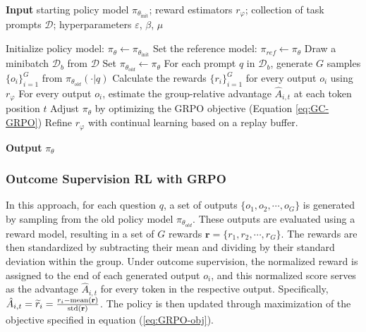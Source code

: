 \begin{itemize}[topsep=0pt]
\begin{algorithm}[t]
  \small
  \caption{Iterative Group Relative Policy Optimization}
  \textbf{Input} starting policy model $\pi_{\theta_{\text{init}}}$; reward estimators $r_\varphi$; collection of task prompts $\mathcal{D}$; 
  hyperparameters $\varepsilon$, $\beta$, $\mu$
  \begin{algorithmic}[1]
    \State Initialize policy model: $\pi_\theta \gets \pi_{\theta_{\text{init}}}$
      \State Set the reference model: $\pi_{ref} \gets \pi_{\theta}$
        \State Draw a minibatch $\mathcal{D}_b$ from $\mathcal{D}$
        \State Set $\pi_{\theta_{old}} \gets \pi_{\theta}$ 
        \State For each prompt $q$ in $\mathcal{D}_b$, generate $G$ samples $\{o_i\}_{i=1}^G$ from $\pi_{\theta_{old}}(\cdot|q)$
        \State Calculate the rewards $\{r_i\}_{i=1}^G$ for every output $o_i$ using $r_{\varphi}$
        \State For every output $o_i$, estimate the group-relative advantage $\hat{A}_{i,t}$ at each token position $t$
          \State Adjust $\pi_{\theta}$ by optimizing the GRPO objective (Equation \ref{eq:GC-GRPO})
        \EndFor
      \EndFor
      \State Refine $r_\varphi$ with continual learning based on a replay buffer.
    \EndFor
  \end{algorithmic}
  \textbf{Output} $\pi_\theta$
  \label{alg:iter-grpo}
\end{algorithm}

\subsubsection{Outcome Supervision RL with GRPO} In this approach, for each question $q$, a set of outputs $\{o_1, o_2, \cdots, o_G\}$ is generated by sampling from the old policy model $\pi_{\theta_{old}}$. These outputs are evaluated using a reward model, resulting in a set of $G$ rewards $\mathbf{r} = \{r_1, r_2, \cdots, r_G\}$. The rewards are then standardized by subtracting their mean and dividing by their standard deviation within the group. Under outcome supervision, the normalized reward is assigned to the end of each generated output $o_i$, and this normalized score serves as the advantage $\hat{A}_{i, t}$ for every token in the respective output. Specifically, $\hat{A}_{i, t} = \widetilde{r}_i = \frac{r_i- {\rm mean}(\mathbf{r})}{{\rm std}(\mathbf{r})}$. The policy is then updated through maximization of the objective specified in equation (\ref{eq:GRPO-obj}).


\end{itemize}
